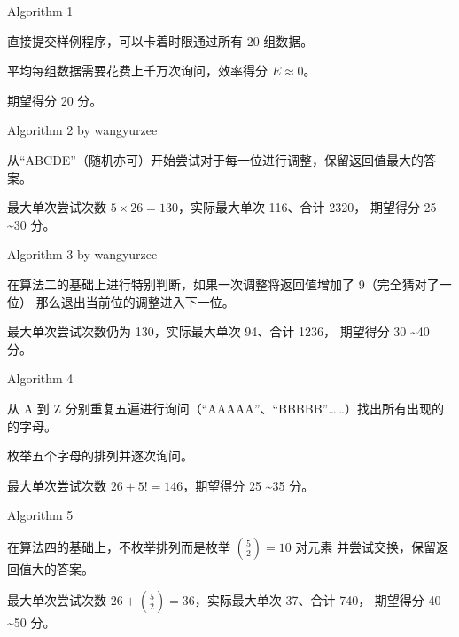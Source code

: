 \documentclass[UTF8]{beamer}
\begin{document}
\begin{frame}{Algorithm 1}

直接提交样例程序，可以卡着时限通过所有 20 组数据。

平均每组数据需要花费上千万次询问，效率得分 $E \approx 0$。\newline\newline

\pause 期望得分 20 分。

\end{frame}

\begin{frame}{Algorithm 2 by wangyurzee}

从“ABCDE”（随机亦可）开始尝试对于每一位进行调整，保留返回值最大的答案。\newline\newline

\pause 最大单次尝试次数 $5 \times 26 = 130$，实际最大单次 116、合计 2320，
期望得分 25 \textasciitilde 30 分。

\end{frame}

\begin{frame}{Algorithm 3 by wangyurzee}

在算法二的基础上进行特别判断，如果一次调整将返回值增加了 9（完全猜对了一位）%
那么退出当前位的调整进入下一位。\newline\newline

\pause 最大单次尝试次数仍为 130，实际最大单次 94、合计 1236，
期望得分 30 \textasciitilde 40 分。

\end{frame}

\begin{frame}{Algorithm 4}

从 A 到 Z 分别重复五遍进行询问（“AAAAA”、“BBBBB”……）找出所有出现的的字母。

枚举五个字母的排列并逐次询问。\newline\newline

\pause 最大单次尝试次数 $26 + 5! = 146$，期望得分 25 \textasciitilde 35 分。

\end{frame}

\begin{frame}{Algorithm 5}

在算法四的基础上，不枚举排列而是枚举 $\binom{5}{2} = 10$ 对元素%
并尝试交换，保留返回值大的答案。\newline\newline

\pause 最大单次尝试次数 $26 + \binom{5}{2} = 36$，实际最大单次 37、合计 740，
期望得分 40 \textasciitilde 50 分。

\end{frame}
\end{document}
